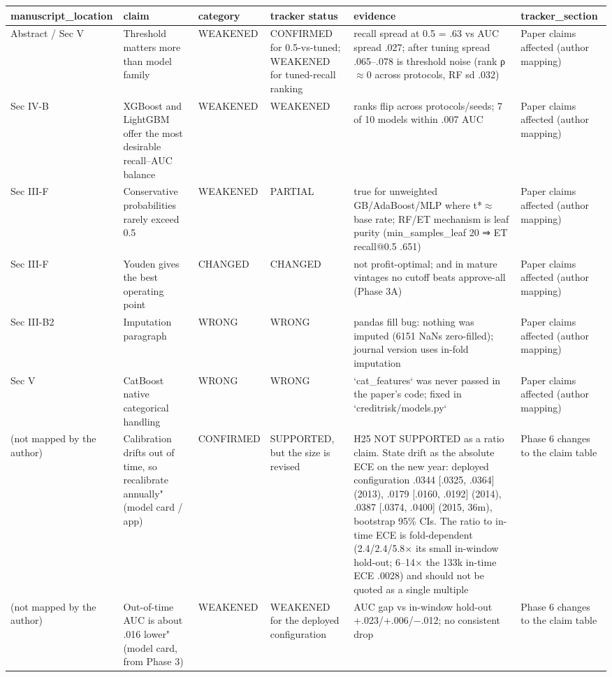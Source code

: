 \begin{tabular}{lp{5.2cm}lp{5.2cm}p{5.2cm}p{5.2cm}}
\toprule
manuscript\_location & claim & category & tracker status & evidence & tracker\_section \\
\midrule
Abstract / Sec V & Threshold matters more than model family & WEAKENED & CONFIRMED for 0.5-vs-tuned; WEAKENED for tuned-recall ranking & recall spread at 0.5 = .63 vs AUC spread .027; after tuning spread .065--.078 is threshold noise (rank ρ$\approx$0 across protocols, RF sd .032) & Paper claims affected (author mapping) \\
Sec IV-B & XGBoost and LightGBM offer the most desirable recall--AUC balance & WEAKENED & WEAKENED & ranks flip across protocols/seeds; 7 of 10 models within .007 AUC & Paper claims affected (author mapping) \\
Sec III-F & Conservative probabilities rarely exceed 0.5 & WEAKENED & PARTIAL & true for unweighted GB/AdaBoost/MLP where t*$\approx$base rate; RF/ET mechanism is leaf purity (min\_samples\_leaf 20 ⇒ ET recall@0.5 .651) & Paper claims affected (author mapping) \\
Sec III-F & Youden gives the best operating point & CHANGED & CHANGED & not profit-optimal; and in mature vintages no cutoff beats approve-all (Phase 3A) & Paper claims affected (author mapping) \\
Sec III-B2 & Imputation paragraph & WRONG & WRONG & pandas fill bug: nothing was imputed (6151 NaNs zero-filled); journal version uses in-fold imputation & Paper claims affected (author mapping) \\
Sec V & CatBoost native categorical handling & WRONG & WRONG & `cat\_features` was never passed in the paper's code; fixed in `creditrisk/models.py` & Paper claims affected (author mapping) \\
(not mapped by the author) & Calibration drifts out of time, so recalibrate annually" (model card / app) & CONFIRMED & SUPPORTED, but the size is revised & H25 NOT SUPPORTED as a ratio claim. State drift as the absolute ECE on the new year: deployed configuration .0344 [.0325, .0364] (2013), .0179 [.0160, .0192] (2014), .0387 [.0374, .0400] (2015, 36m), bootstrap 95\% CIs. The ratio to in-time ECE is fold-dependent (2.4/2.4/5.8$\times$ its small in-window hold-out; 6--14$\times$ the 133k in-time ECE .0028) and should not be quoted as a single multiple & Phase 6 changes to the claim table \\
(not mapped by the author) & Out-of-time AUC is about .016 lower" (model card, from Phase 3) & WEAKENED & WEAKENED for the deployed configuration & AUC gap vs in-window hold-out +.023/+.006/$-$.012; no consistent drop & Phase 6 changes to the claim table \\

\end{tabular}
